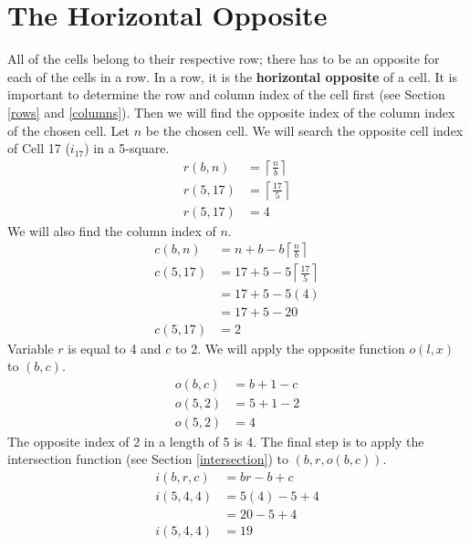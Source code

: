 \documentclass[letterpaper, twoside,12pt]{book}
\begin{document}
    \section{The Horizontal Opposite} \label{horizontal_opposite}
    All of the cells belong to their respective row; there has to be an opposite for each of the cells in a row. In a row, it is the \textbf{horizontal opposite} of a cell. It is important to determine the row and column index of the cell first (see Section \ref{rows} and \ref{columns}). Then we will find the opposite index of the column index of the chosen cell. Let $n$ be the chosen cell. We will search the opposite cell index of Cell 17 ($i_{17}$) in a 5-square.
    \begin{equation}
        \begin{split}
            r(b,n) &= \left\lceil \frac{n}{b}\right\rceil \\
            r(5,17) &= \left\lceil \frac{17}{5}\right\rceil \\
            r(5,17) &= 4
        \end{split}
    \end{equation}
    We will also find the column index of $n$.
    \begin{equation}
        \begin{split}
            c(b,n) &= n + b - b\left\lceil \frac{n}{b}\right\rceil \\
            c(5,17) &= 17 + 5 - 5\left\lceil \frac{17}{5}\right\rceil \\
                &= 17 + 5 - 5(4) \\
                &= 17 + 5 - 20 \\
            c(5,17) &= 2
        \end{split}
    \end{equation}
    Variable $r$ is equal to 4 and $c$ to 2. We will apply the opposite function $o(l,x)$ to $(b,c)$.
    \begin{equation}
        \begin{split}
            o(b,c) &= b + 1 - c \\
            o(5,2) &= 5 + 1 - 2 \\
            o(5,2) &= 4
        \end{split}
    \end{equation}
    The opposite index of 2 in a length of 5 is 4. The final step is to apply the intersection function (see Section \ref{intersection}) to $(b,r,o(b,c))$.
    \begin{equation}
        \begin{split}
            i(b,r,c) &= br - b + c \\
            i(5,4,4) &= 5(4) - 5 + 4 \\
                &= 20 - 5 + 4 \\
            i(5,4,4) &= 19 \\
        \end{split}
    \end{equation}
\end{document}
